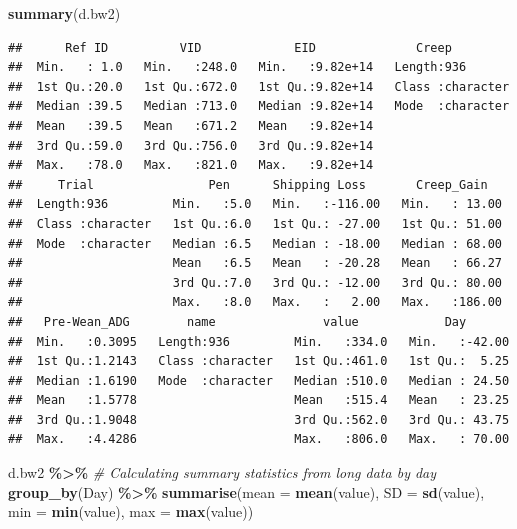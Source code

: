 \documentclass[
]{book}
\newenvironment{Shaded}{\begin{snugshade}}{\end{snugshade}}
\newcommand{\AttributeTok}[1]{\textcolor[rgb]{0.13,0.29,0.53}{#1}}
\newcommand{\CommentTok}[1]{\textcolor[rgb]{0.56,0.35,0.01}{\textit{#1}}}
\newcommand{\FunctionTok}[1]{\textcolor[rgb]{0.13,0.29,0.53}{\textbf{#1}}}
\newcommand{\NormalTok}[1]{#1}
\newcommand{\SpecialCharTok}[1]{\textcolor[rgb]{0.81,0.36,0.00}{\textbf{#1}}}
\begin{document}
\begin{Shaded}
\begin{Highlighting}[]
\FunctionTok{summary}\NormalTok{(d.bw2)}
\end{Highlighting}
\end{Shaded}

\begin{verbatim}
##      Ref ID          VID             EID              Creep          
##  Min.   : 1.0   Min.   :248.0   Min.   :9.82e+14   Length:936        
##  1st Qu.:20.0   1st Qu.:672.0   1st Qu.:9.82e+14   Class :character  
##  Median :39.5   Median :713.0   Median :9.82e+14   Mode  :character  
##  Mean   :39.5   Mean   :671.2   Mean   :9.82e+14                     
##  3rd Qu.:59.0   3rd Qu.:756.0   3rd Qu.:9.82e+14                     
##  Max.   :78.0   Max.   :821.0   Max.   :9.82e+14                     
##     Trial                Pen      Shipping Loss       Creep_Gain    
##  Length:936         Min.   :5.0   Min.   :-116.00   Min.   : 13.00  
##  Class :character   1st Qu.:6.0   1st Qu.: -27.00   1st Qu.: 51.00  
##  Mode  :character   Median :6.5   Median : -18.00   Median : 68.00  
##                     Mean   :6.5   Mean   : -20.28   Mean   : 66.27  
##                     3rd Qu.:7.0   3rd Qu.: -12.00   3rd Qu.: 80.00  
##                     Max.   :8.0   Max.   :   2.00   Max.   :186.00  
##   Pre-Wean_ADG        name               value            Day        
##  Min.   :0.3095   Length:936         Min.   :334.0   Min.   :-42.00  
##  1st Qu.:1.2143   Class :character   1st Qu.:461.0   1st Qu.:  5.25  
##  Median :1.6190   Mode  :character   Median :510.0   Median : 24.50  
##  Mean   :1.5778                      Mean   :515.4   Mean   : 23.25  
##  3rd Qu.:1.9048                      3rd Qu.:562.0   3rd Qu.: 43.75  
##  Max.   :4.4286                      Max.   :806.0   Max.   : 70.00
\end{verbatim}

\begin{Shaded}
\begin{Highlighting}[]
\NormalTok{d.bw2 }\SpecialCharTok{\%\textgreater{}\%} \CommentTok{\# Calculating summary statistics from long data by day}
  \FunctionTok{group\_by}\NormalTok{(Day) }\SpecialCharTok{\%\textgreater{}\%} 
  \FunctionTok{summarise}\NormalTok{(}\AttributeTok{mean =} \FunctionTok{mean}\NormalTok{(value),}
            \AttributeTok{SD =} \FunctionTok{sd}\NormalTok{(value),}
            \AttributeTok{min =} \FunctionTok{min}\NormalTok{(value),}
            \AttributeTok{max =} \FunctionTok{max}\NormalTok{(value))}
\end{Highlighting}
\end{Shaded}
\end{document}

